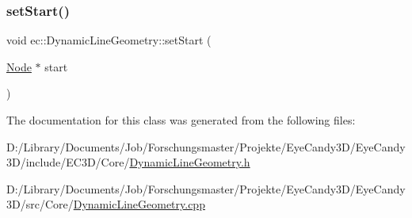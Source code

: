 \mbox{\label{classec_1_1_dynamic_line_geometry_a7354615fc961c1d6d6e9ec09bdb5bdf9}} 
\subsubsection{\texorpdfstring{set\+Start()}{setStart()}}
{\footnotesize\ttfamily void ec\+::\+Dynamic\+Line\+Geometry\+::set\+Start (\begin{DoxyParamCaption}\item[{\mbox{\hyperlink{classec_1_1_node}{Node}} $\ast$}]{start }\end{DoxyParamCaption})}



The documentation for this class was generated from the following files\+:\begin{DoxyCompactItemize}
\item 
D\+:/\+Library/\+Documents/\+Job/\+Forschungsmaster/\+Projekte/\+Eye\+Candy3\+D/\+Eye\+Candy3\+D/include/\+E\+C3\+D/\+Core/\mbox{\hyperlink{_dynamic_line_geometry_8h}{Dynamic\+Line\+Geometry.\+h}}\item 
D\+:/\+Library/\+Documents/\+Job/\+Forschungsmaster/\+Projekte/\+Eye\+Candy3\+D/\+Eye\+Candy3\+D/src/\+Core/\mbox{\hyperlink{_dynamic_line_geometry_8cpp}{Dynamic\+Line\+Geometry.\+cpp}}\end{DoxyCompactItemize}

